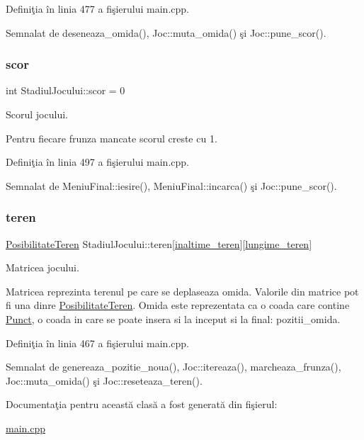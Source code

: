 Definiţia în linia 477 a fişierului main.\+cpp.



Semnalat de deseneaza\+\_\+omida(), Joc\+::muta\+\_\+omida() şi Joc\+::pune\+\_\+scor().

\mbox{\label{classStadiulJocului_a1c96d2d1fdcc40bf7c111f549f14ccb5}} 
\subsubsection{\texorpdfstring{scor}{scor}}
{\footnotesize\ttfamily int Stadiul\+Jocului\+::scor = 0}



Scorul jocului. 

Pentru fiecare frunza mancate scorul creste cu 1. 

Definiţia în linia 497 a fişierului main.\+cpp.



Semnalat de Meniu\+Final\+::iesire(), Meniu\+Final\+::incarca() şi Joc\+::pune\+\_\+scor().

\mbox{\label{classStadiulJocului_a2e71823589e83f16593f8a2870c065e6}} 
\subsubsection{\texorpdfstring{teren}{teren}}
{\footnotesize\ttfamily \hyperlink{main_8cpp_a67b02df562611307c1e3adeace56d13e}{Posibilitate\+Teren} Stadiul\+Jocului\+::teren\mbox{[}\hyperlink{classStadiulJocului_a19203356f61f0f11191445347092bd3c}{inaltime\+\_\+teren}\mbox{]}\mbox{[}\hyperlink{classStadiulJocului_ab1b866a96905e3491008c1e7268d9983}{lungime\+\_\+teren}\mbox{]}}



Matricea jocului. 

Matricea reprezinta terenul pe care se deplaseaza omida. Valorile din matrice pot fi una dinre \hyperlink{main_8cpp_a67b02df562611307c1e3adeace56d13e}{Posibilitate\+Teren}. Omida este reprezentata ca o coada care contine \hyperlink{structPunct}{Punct}, o coada in care se poate insera si la inceput si la final\+: pozitii\+\_\+omida. 

Definiţia în linia 467 a fişierului main.\+cpp.



Semnalat de genereaza\+\_\+pozitie\+\_\+noua(), Joc\+::itereaza(), marcheaza\+\_\+frunza(), Joc\+::muta\+\_\+omida() şi Joc\+::reseteaza\+\_\+teren().



Documentaţia pentru această clasă a fost generată din fişierul\+:\begin{DoxyCompactItemize}
\item 
\hyperlink{main_8cpp}{main.\+cpp}\end{DoxyCompactItemize}
